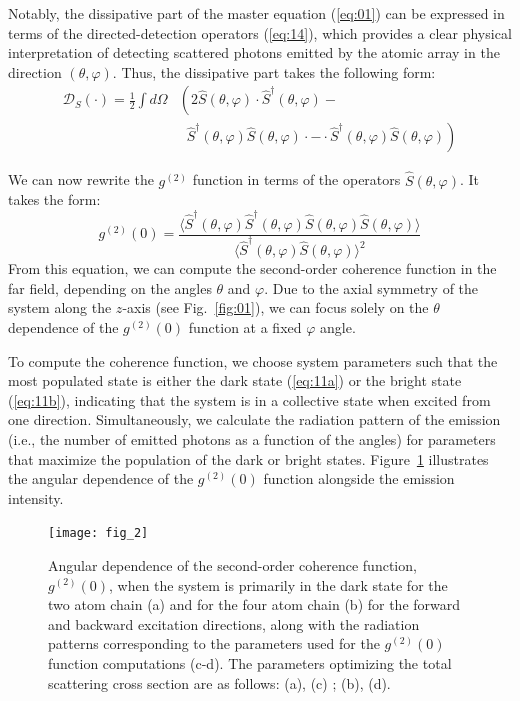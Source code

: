 \documentclass[aps,prl,twocolumn,superscriptaddress,showpacs,amsmath,amssymb]{revtex4-2}
\begin{document}
Notably, the dissipative part of the master equation (\ref{eq:01}) can be expressed in terms of the directed-detection operators (\ref{eq:14}), which provides a clear physical interpretation of detecting scattered photons emitted by the atomic array in the direction $(\theta, \varphi)$. Thus, the dissipative part takes the following form:
\begin{align}
    \label{eq:16}
    \mathcal{D}_S(\cdot) = \frac{1}{2} \int d \Omega & \left( 2 \hat{S}(\theta, \varphi) \cdot \hat{S}^\dagger(\theta, \varphi) - \right. \\
                                                   & \;\; \left. \hat{S}^\dagger(\theta, \varphi)\hat{S}(\theta, \varphi) \cdot - \cdot \hat{S}^\dagger(\theta, \varphi) \hat{S}(\theta, \varphi)\right) \nonumber
\end{align}

We can now rewrite the $g^{(2)}$ function in terms of the operators $\hat{S}(\theta, \varphi)$. It takes the form:
\begin{equation}
    \label{eq:17}
    g^{(2)}(0) = \frac{\langle \hat{S}^\dagger(\theta, \varphi)\hat{S}^\dagger(\theta, \varphi)\hat{S}(\theta, \varphi)\hat{S}(\theta, \varphi) \rangle}{\langle \hat{S}^\dagger(\theta, \varphi)\hat{S}(\theta, \varphi) \rangle^2}
\end{equation}
From this equation, we can compute the second-order coherence function in the far field, depending on the angles $\theta$ and $\varphi$. Due to the axial symmetry of the system along the $z$-axis (see Fig.~\ref{fig:01}), we can focus solely on the $\theta$ dependence of the $g^{(2)}(0)$ function at a fixed $\varphi$ angle.

To compute the coherence function, we choose system parameters such that the most populated state is either the dark state (\ref{eq:11a}) or the bright state (\ref{eq:11b}), indicating that the system is in a collective state when excited from one direction. Simultaneously, we calculate the radiation pattern of the emission (i.e., the number of emitted photons as a function of the angles) for parameters that maximize the population of the dark or bright states. Figure~\ref{fig:02} illustrates the angular dependence of the $g^{(2)}(0)$ function alongside the emission intensity.

\begin{figure}[h]
    \centering
    \texttt{[image: fig\_2]}
    \caption{Angular dependence of the second-order coherence function, $g^{(2)}(0)$, when the system is primarily in the dark state for the two atom chain (a) and for the four atom chain (b) for the forward and backward excitation directions, along with the radiation patterns corresponding to the
    parameters used for the $g^{(2)}(0)$ function computations (c-d). The parameters optimizing the total scattering cross section are as follows: (a), (c) ; (b), (d).}
    \label{fig:02}
\end{figure}
\end{document}
